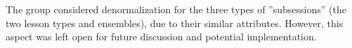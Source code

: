 \documentclass[a4paper]{scrartcl}
\begin{document}
The group considered denormalization for the three types of ''subsessions'' (the two lesson types and ensembles),
due to their similar attributes.
However, this aspect was left open for future discussion and potential implementation.


\end{document}
